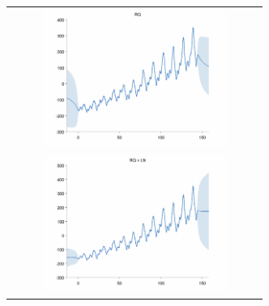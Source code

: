 \documentclass[twoside]{article}
\begin{document}
\begin{figure}[h!]
\centering
\newcommand{\wag}{8cm}  %
\newcommand{\hag}{4.5cm}  %
\begin{tabular}{c}
 \includegraphics[width=\wag,height=\hag]{../figures/decomposition/01-airline-months_max_level_0/01-airline-months_all} \\ 
 \includegraphics[width=\wag,height=\hag]{../figures/decomposition/01-airline-months_max_level_1/01-airline-months_all} \\

\end{tabular}
\end{figure}
\end{document}
